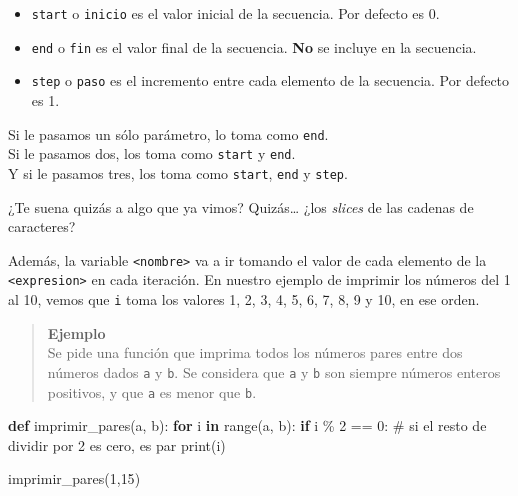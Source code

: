 \documentclass[
  letterpaper,
  DIV=11,
  numbers=noendperiod]{scrreprt}
\newenvironment{Shaded}{\begin{snugshade}}{\end{snugshade}}
\newcommand{\BuiltInTok}[1]{\textcolor[rgb]{0.00,0.23,0.31}{#1}}
\newcommand{\CommentTok}[1]{\textcolor[rgb]{0.37,0.37,0.37}{#1}}
\newcommand{\ControlFlowTok}[1]{\textcolor[rgb]{0.00,0.23,0.31}{\textbf{#1}}}
\newcommand{\DecValTok}[1]{\textcolor[rgb]{0.68,0.00,0.00}{#1}}
\newcommand{\KeywordTok}[1]{\textcolor[rgb]{0.00,0.23,0.31}{\textbf{#1}}}
\newcommand{\NormalTok}[1]{\textcolor[rgb]{0.00,0.23,0.31}{#1}}
\newcommand{\OperatorTok}[1]{\textcolor[rgb]{0.37,0.37,0.37}{#1}}
\providecommand{\tightlist}{%
  \setlength{\itemsep}{0pt}\setlength{\parskip}{0pt}}\usepackage{longtable,booktabs,array}
\begin{document}
\begin{itemize}
\tightlist
\item
  \texttt{start} o \texttt{inicio} es el valor inicial de la secuencia.
  Por defecto es 0.
\item
  \texttt{end} o \texttt{fin} es el valor final de la secuencia.
  \textbf{No} se incluye en la secuencia.
\item
  \texttt{step} o \texttt{paso} es el incremento entre cada elemento de
  la secuencia. Por defecto es 1.
\end{itemize}

Si le pasamos un sólo parámetro, lo toma como \texttt{end}.\\
Si le pasamos dos, los toma como \texttt{start} y \texttt{end}.\\
Y si le pasamos tres, los toma como \texttt{start}, \texttt{end} y
\texttt{step}.

\begin{tcolorbox}[enhanced jigsaw, arc=.35mm, toptitle=1mm, colframe=quarto-callout-note-color-frame, bottomtitle=1mm, opacitybacktitle=0.6, colbacktitle=quarto-callout-note-color!10!white, leftrule=.75mm, coltitle=black, toprule=.15mm, titlerule=0mm, title=\textcolor{quarto-callout-note-color}{\faInfo}\hspace{0.5em}{Note}, bottomrule=.15mm, rightrule=.15mm, colback=white, breakable, opacityback=0, left=2mm]

¿Te suena quizás a algo que ya vimos? Quizás\ldots{} ¿los \emph{slices}
de las cadenas de caracteres?

\end{tcolorbox}

Además, la variable \texttt{\textless{}nombre\textgreater{}} va a ir
tomando el valor de cada elemento de la
\texttt{\textless{}expresion\textgreater{}} en cada iteración. En
nuestro ejemplo de imprimir los números del 1 al 10, vemos que
\texttt{i} toma los valores 1, 2, 3, 4, 5, 6, 7, 8, 9 y 10, en ese
orden.\\

\begin{quote}
\textbf{Ejemplo}\\
Se pide una función que imprima todos los números pares entre dos
números dados \texttt{a} y \texttt{b}. Se considera que \texttt{a} y
\texttt{b} son siempre números enteros positivos, y que \texttt{a} es
menor que \texttt{b}.
\end{quote}

\begin{Shaded}
\begin{Highlighting}[]
\KeywordTok{def}\NormalTok{ imprimir\_pares(a, b):}
  \ControlFlowTok{for}\NormalTok{ i }\KeywordTok{in} \BuiltInTok{range}\NormalTok{(a, b):}
    \ControlFlowTok{if}\NormalTok{ i }\OperatorTok{\%} \DecValTok{2} \OperatorTok{==} \DecValTok{0}\NormalTok{: }\CommentTok{\# si el resto de dividir por 2 es cero, es par}
      \BuiltInTok{print}\NormalTok{(i)}

\NormalTok{imprimir\_pares(}\DecValTok{1}\NormalTok{,}\DecValTok{15}\NormalTok{)}
\end{Highlighting}
\end{Shaded}
\end{document}
